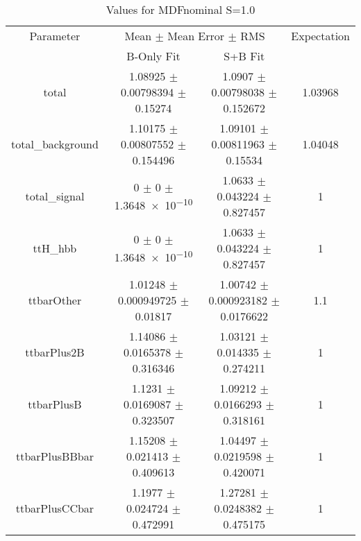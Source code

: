 \begin{table}
\centering
\caption{Values for MDFnominal S=1.0}
\begin{tabular}{cccc}
\toprule
Parameter & \multicolumn{2}{c}{Mean $\pm$ Mean Error $\pm$ RMS} & Expectation\\
 & B-Only Fit & S+B Fit & \\
\midrule
total & \num{1.08925} $\pm$ \num{0.00798394} $\pm$ \num{0.15274} & \num{1.0907} $\pm$ \num{0.00798038} $\pm$ \num{0.152672} & \num{1.03968}\\
total\_background & \num{1.10175} $\pm$ \num{0.00807552} $\pm$ \num{0.154496} & \num{1.09101} $\pm$ \num{0.00811963} $\pm$ \num{0.15534} & \num{1.04048}\\
total\_signal & \num{0} $\pm$ \num{0} $\pm$ \num{1.3648e-10} & \num{1.0633} $\pm$ \num{0.043224} $\pm$ \num{0.827457} & \num{1}\\
ttH\_hbb & \num{0} $\pm$ \num{0} $\pm$ \num{1.3648e-10} & \num{1.0633} $\pm$ \num{0.043224} $\pm$ \num{0.827457} & \num{1}\\
ttbarOther & \num{1.01248} $\pm$ \num{0.000949725} $\pm$ \num{0.01817} & \num{1.00742} $\pm$ \num{0.000923182} $\pm$ \num{0.0176622} & \num{1.1}\\
ttbarPlus2B & \num{1.14086} $\pm$ \num{0.0165378} $\pm$ \num{0.316346} & \num{1.03121} $\pm$ \num{0.014335} $\pm$ \num{0.274211} & \num{1}\\
ttbarPlusB & \num{1.1231} $\pm$ \num{0.0169087} $\pm$ \num{0.323507} & \num{1.09212} $\pm$ \num{0.0166293} $\pm$ \num{0.318161} & \num{1}\\
ttbarPlusBBbar & \num{1.15208} $\pm$ \num{0.021413} $\pm$ \num{0.409613} & \num{1.04497} $\pm$ \num{0.0219598} $\pm$ \num{0.420071} & \num{1}\\
ttbarPlusCCbar & \num{1.1977} $\pm$ \num{0.024724} $\pm$ \num{0.472991} & \num{1.27281} $\pm$ \num{0.0248382} $\pm$ \num{0.475175} & \num{1}\\
\bottomrule
\end{tabular}
\end{table}